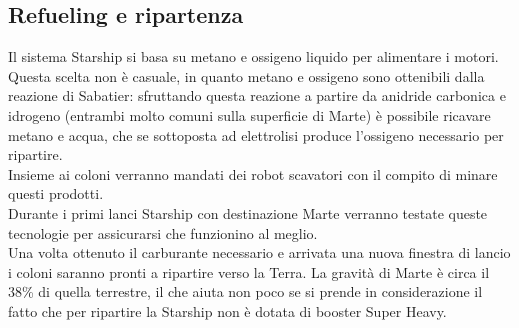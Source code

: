 \subsection{Refueling e ripartenza}
Il sistema Starship si basa su metano e ossigeno liquido per alimentare i motori. Questa scelta non è casuale, in quanto metano e ossigeno sono ottenibili dalla reazione di Sabatier: sfruttando questa reazione a partire da anidride carbonica e idrogeno (entrambi molto comuni sulla superficie di Marte) è possibile ricavare metano e acqua, che se sottoposta ad elettrolisi produce l'ossigeno necessario per ripartire.\\
Insieme ai coloni verranno mandati dei robot scavatori con il compito di minare questi prodotti.\\
Durante i primi lanci Starship con destinazione Marte verranno testate queste tecnologie per assicurarsi che funzionino al meglio.\\
Una volta ottenuto il carburante necessario e arrivata una nuova finestra di lancio i coloni saranno pronti a ripartire verso la Terra. La gravità di Marte è circa il 38\% di quella terrestre, il che aiuta non poco se si prende in considerazione il fatto che per ripartire la Starship non è dotata di booster Super Heavy.\\
    